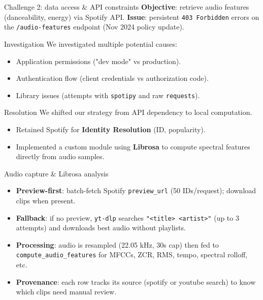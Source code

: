 \documentclass{beamer}
\begin{document}
\begin{frame}{Challenge 2: data access \& API constraints}
    \textbf{Objective}: retrieve audio features (danceability, energy) via Spotify API.
    \textbf{Issue}: persistent \texttt{403 Forbidden} errors on the \texttt{/audio-features} endpoint (Nov 2024 policy update).

    \begin{block}{Investigation}
        We investigated multiple potential causes:
        \begin{itemize}
            \item Application permissions ("dev mode" vs production).
            \item Authentication flow (client credentials vs authorization code).
            \item Library issues (attempts with \texttt{spotipy} and raw \texttt{requests}).
        \end{itemize}
    \end{block}

    \begin{alertblock}{Resolution}
        We shifted our strategy from API dependency to local computation.
        \begin{itemize}
            \item Retained Spotify for \textbf{Identity Resolution} (ID, popularity).
            \item Implemented a custom module using \textbf{Librosa} to compute spectral features directly from audio samples.
        \end{itemize}
    \end{alertblock}
\end{frame}

\begin{frame}{Audio capture \& Librosa analysis}
    \begin{itemize}
        \item \textbf{Preview-first}: batch-fetch Spotify \texttt{preview\_url} (50 IDs/request); download clips when present.
        \item \textbf{Fallback}: if no preview, \texttt{yt-dlp} searches \texttt{"<title> <artist>"} (up to 3 attempts) and downloads best audio without playlists.
        \item \textbf{Processing}: audio is resampled (22.05 kHz, 30s cap) then fed to \texttt{compute\_audio\_features} for MFCCs, ZCR, RMS, tempo, spectral rolloff, etc.
        \item \textbf{Provenance}: each row tracks its source (spotify or youtube search) to know which clips need manual review.
    \end{itemize}
\end{frame}
\end{document}
